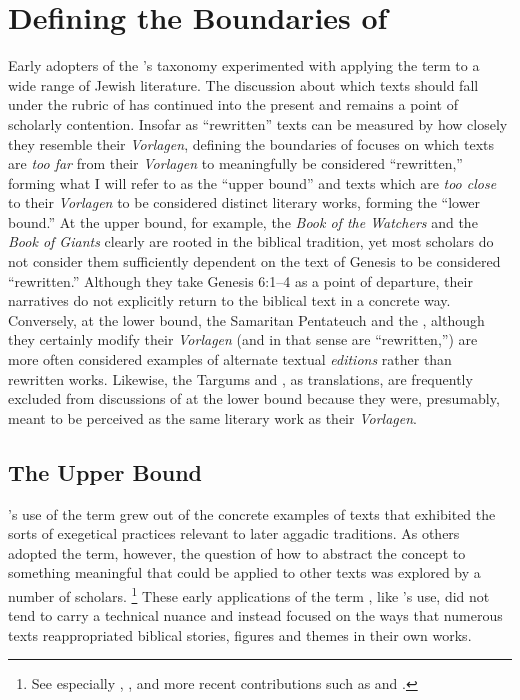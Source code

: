 \section{Defining the Boundaries of \rwb}

Early adopters of the \vermes's taxonomy experimented with applying the term \rwb to a wide range of \secondtemple Jewish literature. The discussion about which texts should fall under the rubric of \rwb has continued into the present and remains a point of scholarly contention. Insofar as ``rewritten'' texts can be measured by how closely they resemble their \emph{Vorlagen}, defining the boundaries of \rwb focuses on which texts are \emph{too far} from their \emph{Vorlagen} to meaningfully be considered ``rewritten,'' forming what I will refer to as the ``upper bound'' and texts which are \emph{too close} to their \emph{Vorlagen} to be considered distinct literary works, forming the ``lower bound.'' At the upper bound, for example, the \emph{Book of the Watchers} and the \emph{Book of Giants} clearly are rooted in the biblical tradition, yet most scholars do not consider them sufficiently dependent on the text of Genesis to be considered ``rewritten.'' Although they take Genesis 6:1--4 as a point of departure, their narratives do not explicitly return to the biblical text in a concrete way. Conversely, at the lower bound, the Samaritan Pentateuch and the , although they certainly modify their \emph{Vorlagen} (and in that sense are ``rewritten,'') are more often considered examples of alternate textual \emph{editions} rather than rewritten works. Likewise, the Targums and \lxx, as translations, are frequently excluded from discussions of \rwb at the lower bound because they were, presumably, meant to be perceived as the same literary work as their \emph{Vorlagen}. 


\subsection{The Upper Bound}

\vermes's use of the term \rwb grew out of the concrete examples of texts that exhibited the sorts of exegetical practices relevant to later aggadic traditions. As others adopted the term, however, the question of how to abstract the concept to something meaningful that could be applied to other texts was explored by a number of scholars.%
    \footnote{%
        See especially
        \cite{nickelsburg_stone1984},
        \cite{harrington_kraft-nickelsburg1986}, 
        and more recent contributions such as 
        \cite{crawford2008} and 
        \cite{falk2007}.}
These early applications of the term \rwb, like \vermes's use, did not tend to carry a technical nuance and instead focused on the ways that numerous texts reappropriated biblical stories, figures and themes in their own works. 

